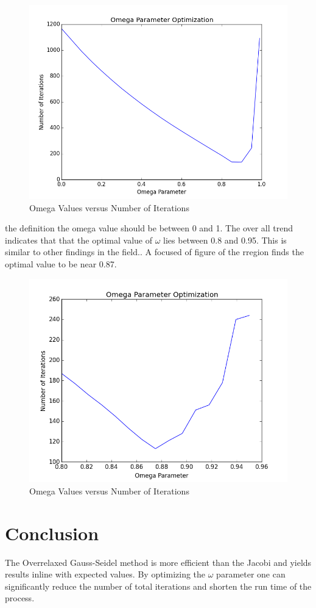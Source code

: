 \documentclass[aps,prb,twocolumn,amsfonts,showpacs,letterpaper]{revtex4}
\begin{document}
\begin{figure}[H]
\centering
\includegraphics[scale=0.35]{omega.png}
\caption{Omega Values versus Number of Iterations}
\end{figure}

the definition the omega value should be between 0 and 1. The over all trend indicates that that the optimal value of $\omega$ lies  between 0.8 and 0.95. This is similar to other findings in the field.\cite{new}. A focused of figure of the rregion finds the optimal value to be near 0.87.

\begin{figure}[H]
\centering
\includegraphics[scale=0.35]{omega2.png}
\caption{Omega Values versus Number of Iterations}
\end{figure}

\section{Conclusion}

The Overrelaxed Gauss-Seidel method is more efficient than the Jacobi and yields results inline with expected values. By optimizing the $\omega$ parameter one can significantly reduce the number of total iterations and shorten the run time of the process.


\end{document}
